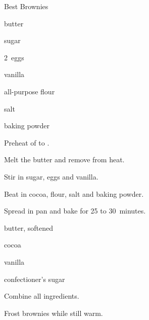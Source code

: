 \begin{recipe}{Best Brownies}{}{}

\begin{ingredients}
\item \C{\half} butter
\item {} sugar
\item 2~eggs
\item {} vanilla
\item \C{\third} 
\item \C{\half} all-purpose flour
\item \tp{\quarter} salt
\item \tp{\quarter} baking powder
\end{ingredients}

\begin{directions}
\item Preheat of to .
\item Melt the butter and remove from heat.
\item Stir in sugar, eggs and vanilla.
\item Beat in cocoa, flour, salt and baking powder.
\item Spread in pan and bake for 25 to 30~minutes.
\end{directions}


\begin{ingredients}
\item {} butter, softened
\item {} cocoa
\item {} 
\item {} vanilla
\item {} confectioner's sugar
\end{ingredients}

\begin{directions}
\item Combine all ingredients.
\item Frost brownies while still warm.
\end{directions}
\end{recipe}
